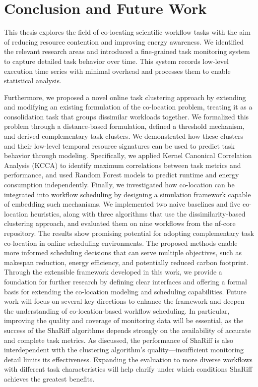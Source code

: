 \section{Conclusion and Future Work}
\label{cha:conclusionfuturework}
This thesis explores the field of co-locating scientific workflow tasks with the aim of reducing resource contention and improving energy awareness. We identified the relevant research areas and introduced a fine-grained task monitoring system to capture detailed task behavior over time. This system records low-level execution time series with minimal overhead and processes them to enable statistical analysis.

Furthermore, we proposed a novel online task clustering approach by extending and modifying an existing formulation of the co-location problem, treating it as a consolidation task that groups dissimilar workloads together. We formalized this problem through a distance-based formulation, defined a threshold mechanism, and derived complementary task clusters. We demonstrated how these clusters and their low-level temporal resource signatures can be used to predict task behavior through modeling. Specifically, we applied Kernel Canonical Correlation Analysis (KCCA) to identify maximum correlations between task metrics and performance, and used Random Forest models to predict runtime and energy consumption independently.
Finally, we investigated how co-location can be integrated into workflow scheduling by designing a simulation framework capable of embedding such mechanisms. We implemented two naive baselines and five co-location heuristics, along with three algorithms that use the dissimilarity-based clustering approach, and evaluated them on nine workflows from the nf-core repository.
The results show promising potential for adopting complementary task co-location in online scheduling environments. The proposed methods enable more informed scheduling decisions that can serve multiple objectives, such as makespan reduction, energy efficiency, and potentially reduced carbon footprint.
Through the extensible framework developed in this work, we provide a foundation for further research by defining clear interfaces and offering a formal basis for extending the co-location modeling and scheduling capabilities.
Future work will focus on several key directions to enhance the framework and deepen the understanding of co-location-based workflow scheduling. In particular, improving the quality and coverage of monitoring data will be essential, as the success of the ShaRiff algorithms depends strongly on the availability of accurate and complete task metrics. As discussed, the performance of ShaRiff is also interdependent with the clustering algorithm's quality—insufficient monitoring detail limits its effectiveness. Expanding the evaluation to more diverse workflows with different task characteristics will help clarify under which conditions ShaRiff achieves the greatest benefits.
